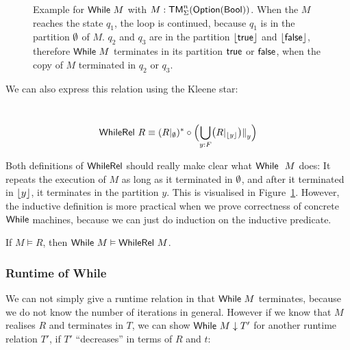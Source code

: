 \begin{figure}
  \center
  
  \caption{Example for $\textsf{While}~ M$ with $M:\textsf{TM}_\Sigma^n(\textsf{Option}(\textsf{Bool}))$.  When the $M$ reaches the state $q_1$, the loop is continued, because $q_1$
    is in the partition $\emptyset$ of $M$.  $q_2$ and $q_3$ are in the partition $\left\lfloor {\ensuremath{\textsf{true}}} \right\rfloor$ and $\left\lfloor {\ensuremath{\textsf{false}}} \right\rfloor$, therefore $\textsf{While}~ M$ terminates in
    its partition $\textsf{true}$ or $\textsf{false}$, when the copy of $M$ terminated in $q_2$ or $q_3$.}
  \label{fig:while-example}
\end{figure}



We can also express this relation using the Kleene star:

\begin{lemma}
  ~
  \[
    \textsf{WhileRel}~R \equiv (R {|}_{\emptyset})^* \circ \Bigl( \bigcup_{y:F} \bigl( R {|}_{\left\lfloor {y} \right\rfloor} \bigr) {|\mkern-1.5mu|}_{y} \Bigr)
  \]
\end{lemma}

Both definitions of $\textsf{WhileRel}$ should really make clear what $\textsf{While}~~M$ does: It repeats the execution of $M$ as long as it terminated in
$\emptyset$, and after it terminated in $\left\lfloor {y} \right\rfloor$, it terminates in the partition $y$.  This is visualised in Figure~\ref{fig:while-example}.  However,
the inductive definition is more practical when we prove correctness of concrete $\textsf{While}$ machines, because we can just do induction on the
inductive predicate.

\begin{lemma}
  If $M \vDash R$, then $\textsf{While}~ M \vDash \textsf{WhileRel}~M$.
\end{lemma}




\subsubsection{Runtime of While}
\label{sec:While-runtime}

We can not simply give a runtime relation in that $\textsf{While}~ M$ terminates, because we do not know the number of iterations in general.  However if we
know that $M$ realises $R$ and terminates in $T$, we can show $\textsf{While}~ M \downarrow T'$ for another runtime relation $T'$, if $T'$ ``decreases'' in
terms of $R$ and $t$:

